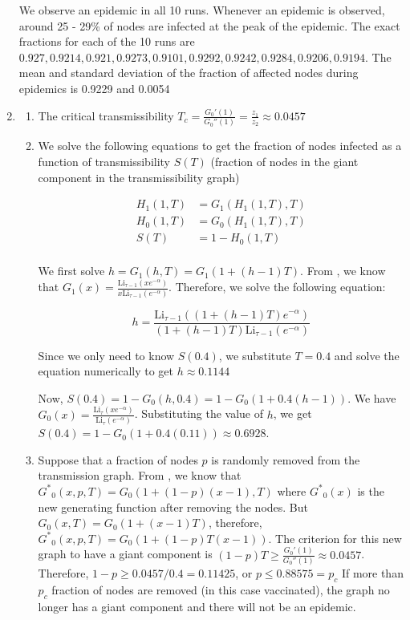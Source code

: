\documentclass{article}
\newcommand{\Li}{\text{Li}}
\begin{document}
\begin{enumerate}
\begin{figure}
\end{figure}

We observe an epidemic in all 10 runs. Whenever an epidemic is observed, around 25 - 29\% of nodes are infected at the peak of the epidemic. The exact fractions for each of the 10 runs are $0.927, 0.9214, 0.921, 0.9273, 0.9101, 0.9292, 0.9242, 0.9284, 0.9206, 0.9194$. 
The mean and standard deviation of the fraction of affected nodes during epidemics is 0.9229 and 0.0054


\item 

\begin{enumerate}
\item The critical transmissibility $T_c = \frac{G_0'(1)}{G_0''(1)} = \frac{z_1}{z_2} \approx 0.0457$

\item We solve the following equations to get the fraction of nodes infected  as a function of transmissibility $S(T)$ (fraction of nodes in the giant component in the transmissibility graph)

\begin{align}
H_1(1, T) &= G_1(H_1(1, T), T) \\
H_0(1, T) &= G_0(H_1(1, T), T) \\
S(T) &= 1 - H_0(1, T)\\
\end{align}

We first solve $h = G_1(h, T) = G_1(1 + (h-1)T)$. From \cite{newman}, we know that $G_1(x) = \frac{\Li_{\tau -1}(xe^{-\alpha})}{x\Li_{\tau -1}(e^{-\alpha})}$. Therefore, we solve the following equation:

$$ h = \frac{\Li_{\tau -1}((1 + (h-1)T)e^{-\alpha})}{(1 + (h-1)T)\Li_{\tau -1}(e^{-\alpha})}$$

Since we only need to know $S(0.4)$, we substitute $T=0.4$ and solve the equation numerically to get $h \approx 0.1144$

Now, $S(0.4) = 1 - G_0(h, 0.4) = 1 - G_0(1 + 0.4(h-1))$. We have $G_0(x) = \frac{\Li_{\tau}(xe^{-\alpha})}{\Li_{\tau}(e^{-\alpha})}$. Substituting the value of $h$, we get $S(0.4) = 1 - G_0(1 + 0.4(0.11) ) \approx  0.6928$.

\item Suppose that a fraction of nodes $p$ is randomly removed from the transmission graph. From \cite{cohen}, we know that ${G^*}_0(x, p, T) = G_0(1 + (1-p)(x-1), T )$ where ${G^*}_0(x)$ is the new generating function after removing the nodes. But $G_0(x, T) = G_0(1 + (x-1)T)$, therefore, ${G^*}_0(x, p, T) = G_0(1 + (1-p)T(x-1))$. 
The criterion for this new graph to have a giant component is $(1-p)T \geq \frac{G_0'(1)}{G_0''(1)} \approx 0.0457$. Therefore, $1-p \geq 0.0457/0.4 = 0.11425$, or $p \leq 0.88575 = p_c$ If more than $p_c$ fraction of nodes are removed (in this case vaccinated), the graph no longer has a giant component and there will not be an epidemic.


\end{enumerate}
\end{enumerate}
\end{document}
